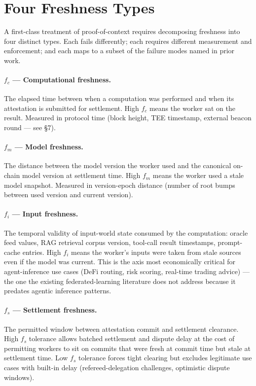\documentclass[11pt]{article}
\begin{document}
\section{Four Freshness Types}

A first-class treatment of proof-of-context requires decomposing freshness into four distinct types. Each fails differently; each requires different measurement and enforcement; and each maps to a subset of the failure modes named in prior work.

\paragraph{$f_c$ --- Computational freshness.} The elapsed time between when a computation was performed and when its attestation is submitted for settlement. High $f_c$ means the worker sat on the result. Measured in protocol time (block height, TEE timestamp, external beacon round --- see \S7).

\paragraph{$f_m$ --- Model freshness.} The distance between the model version the worker used and the canonical on-chain model version at settlement time. High $f_m$ means the worker used a stale model snapshot. Measured in version-epoch distance (number of root bumps between used version and current version).

\paragraph{$f_i$ --- Input freshness.} The temporal validity of input-world state consumed by the computation: oracle feed values, RAG retrieval corpus version, tool-call result timestamps, prompt-cache entries. High $f_i$ means the worker's inputs were taken from stale sources even if the model was current. This is the axis most economically critical for agent-inference use cases (DeFi routing, risk scoring, real-time trading advice) --- the one the existing federated-learning literature does not address because it predates agentic inference patterns.

\paragraph{$f_s$ --- Settlement freshness.} The permitted window between attestation commit and settlement clearance. High $f_s$ tolerance allows batched settlement and dispute delay at the cost of permitting workers to sit on commits that were fresh at commit time but stale at settlement time. Low $f_s$ tolerance forces tight clearing but excludes legitimate use cases with built-in delay (refereed-delegation challenges, optimistic dispute windows).
\end{document}
